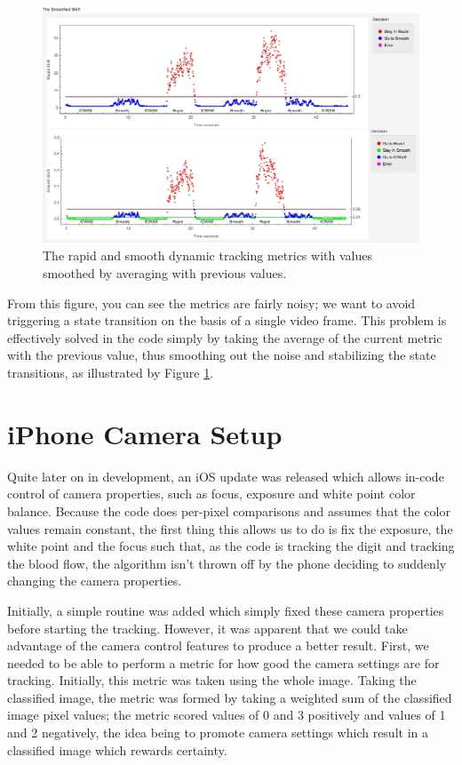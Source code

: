 \begin{figure}[tbph]
\centering
\includegraphics[width=0.95\linewidth]{Chapter4/Figs/smoothedShiftGrfx}
\caption{The rapid and smooth dynamic tracking metrics with values smoothed by averaging with previous values.}
\label{fig:smoothedshiftgrfx}
\end{figure}

From this figure, you can see the metrics are fairly noisy; we want to avoid triggering a state transition on the basis of a single video frame. This problem is effectively solved in the code simply by taking the average of the current metric with the previous value, thus smoothing out the noise and stabilizing the state transitions, as illustrated by Figure \ref{fig:smoothedshiftgrfx}.

\section{iPhone Camera Setup}\label{sec:iPhoneCameraSetup}
Quite later on in development, an iOS update was released which allows in-code control of camera properties, such as focus, exposure and white point color balance. Because the code does per-pixel comparisons and assumes that the color values remain constant, the first thing this allows us to do is fix the exposure, the white point and the focus such that, as the code is tracking the digit and tracking the blood flow, the algorithm isn't thrown off by the phone deciding to suddenly changing the camera properties. 

Initially, a simple routine was added which simply fixed these camera properties before starting the tracking. However, it was apparent that we could take advantage of the camera control features to produce a better result. First, we needed to be able to perform a metric for how good the camera settings are for tracking. Initially, this metric was taken using the whole image. Taking the classified image, the metric was formed by taking a weighted sum of the classified image pixel values; the metric scored values of 0 and 3 positively and values of 1 and 2 negatively, the idea being to promote camera settings which result in a classified image which rewards certainty.

